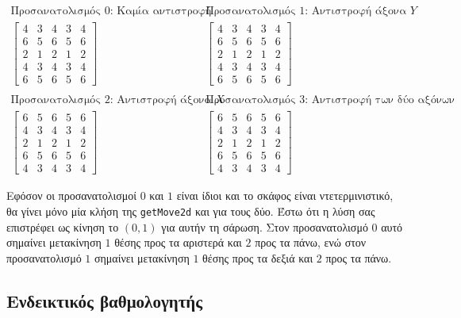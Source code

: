 \documentclass[12pt]{article}
\begin{document}
\[
\begin{array}{cc}
\text{Προσανατολισμός $0$: Καμία αντιστροφή} & \text{Προσανατολισμός $1$: Αντιστροφή άξονα $Y$} \\
\left[
\begin{array}{ccccc}
4 & 3 & 4 & 3 & 4 \\
6 & 5 & 6 & 5 & 6 \\
2 & 1 & 2 & 1 & 2 \\
4 & 3 & 4 & 3 & 4 \\
6 & 5 & 6 & 5 & 6
\end{array}
\right]
&
\left[
\begin{array}{ccccc}
4 & 3 & 4 & 3 & 4 \\
6 & 5 & 6 & 5 & 6 \\
2 & 1 & 2 & 1 & 2 \\
4 & 3 & 4 & 3 & 4 \\
6 & 5 & 6 & 5 & 6
\end{array}
\right]
\\
\\
\text{Προσανατολισμός $2$: Αντιστροφή άξονα $X$} & \text{Προσανατολισμός $3$: Αντιστροφή των δύο αξόνων} \\
\left[
\begin{array}{ccccc}
6 & 5 & 6 & 5 & 6 \\
4 & 3 & 4 & 3 & 4 \\
2 & 1 & 2 & 1 & 2 \\
6 & 5 & 6 & 5 & 6 \\
4 & 3 & 4 & 3 & 4
\end{array}
\right]
&
\left[
\begin{array}{ccccc}
6 & 5 & 6 & 5 & 6 \\
4 & 3 & 4 & 3 & 4 \\
2 & 1 & 2 & 1 & 2 \\
6 & 5 & 6 & 5 & 6 \\
4 & 3 & 4 & 3 & 4
\end{array}
\right]
\end{array}
\] 

Εφόσον οι προσανατολισμοί $0$ και $1$ είναι ίδιοι και το σκάφος είναι ντετερμινιστικό, θα γίνει μόνο μία κλήση της \verb|getMove2d| και για τους δύο. Έστω ότι η λύση σας επιστρέφει ως κίνηση το $(0, 1)$ για αυτήν τη σάρωση. Στον προσανατολισμό $0$ αυτό σημαίνει μετακίνηση $1$ θέσης προς τα αριστερά και $2$ προς τα πάνω, ενώ στον προσανατολισμό $1$ σημαίνει μετακίνηση $1$ θέσης προς τα δεξιά και $2$ προς τα πάνω.

\subsection{Ενδεικτικός βαθμολογητής}
\end{document}
